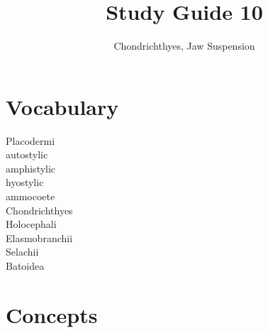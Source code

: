 \documentclass[nofont,letterpaper]{tufte-handout}
\title{Study Guide 10}
\author{Chondrichthyes, Jaw Suspension}
\date{} %
\begin{document}
\maketitle	%


\section{Vocabulary}  
\vspace{-1\baselineskip}
\begin{multicols}{2}
Placodermi \\
autostylic \\
amphistylic \\
hyostylic \\
ammocoete \\
Chondrichthyes \\
Holocephali \\
Elasmobranchii \\
Selachii \\
Batoidea 
\end{multicols}

\section{Concepts}
\end{document}
